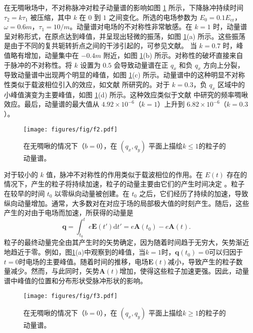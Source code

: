 在无啁啾场中，不对称脉冲对粒子动量谱的影响如图 \ref{2} 所示，下降脉冲持续时间 $\tau_2 = k\tau_1$ 被压缩，其中 $k$ 在 $0$ 到 $1$ 之间变化。所选的电场参数为 $E_0 = 0.1E_{\mathrm{cr}}$，$\omega = 0.6m$，$\tau_1 = 10/m$。动量谱对电场的不对称性非常敏感。在 $k = 1$ 时，动量谱呈对称形式，在原点达到峰值，并呈现出轻微的振荡，如图 \ref{2}(a) 所示。这些振荡是由于不同的复共轭转折点之间的干涉引起的，可参见文献\cite{2010c}。
当 $k = 0.7$ 时，峰值略有增加，动量集中在 $-0.4m$ 附近，如图 \ref{2}(b) 所示。对称性的破坏直接来自于脉冲的不对称性。将 $k$ 设置为 $0.5$ 会导致动量谱在正 $q_x$ 和负 $q_x$ 方向上分裂，导致动量谱中出现两个明显的峰值，如图 \ref{2}(c) 所示。动量谱中的这种明显不对称性类似于载波相位引入的效应，如文献 \cite{2010h} 所研究的。对于 $k = 0.3$，负 $q_x$ 区域中的小峰值演变为主要峰值，如图 \ref{2}(d) 所示。这种效应类似于文献 \cite{2019c} 中研究的频率啁啾效应。最后，动量谱的最大值从 $4.92\times 10^{-6}$（$k = 1$）上升到 $6.82\times 10^{-6}$（$k = 0.3$）。

\begin{figure}
  \centering
  \texttt{[image: figures/fig/f2.pdf]}
  \caption{在无啁啾的情况下（$b = 0$），在 $(q_x, q_y)$ 平面上描绘$k \le 1$的粒子的动量谱。}
  \label{2}
\end{figure}

对于较小的 $k$ 值，脉冲不对称性的作用类似于载波相位的作用。在 $E(t)$ 存在的情况下，产生的粒子将持续加速，粒子的动量主要由它们的产生时间决定 \cite{2011h,2018ck}。粒子在较早的时间 $t_0$ 以零纵向动量被创建。在 $t_0$ 之后，它们经历了持续的加速，导致纵向动量增加。通常，大多数对在对应于场的局部极大值的时刻产生。随后，这些产生的对由于电场而加速，所获得的动量是 \cite{2019c}
\begin{equation}
{\mathbf{q}} = \int_{t_{0}}^{t} e \mathbf{E}(t') \mathrm{d} t' = e \mathbf{A}\left(t_{0}\right)-e \mathbf{A}(t).
\end{equation}
粒子的最终动量完全由其产生时的矢势确定，因为随着时间趋于无穷大，矢势渐近地趋近于零。例如，图\ref{2}(a)中观察到的峰值，当$k=1$时，$\mathbf{q}\left(t_{0}\right)=0$可以归因于$t=0$时电场的主要峰值。随着时间的推移，电场$\mathbf{E}(t)$减小，导致产生的粒子数量减少。然而，与此同时，矢势$\mathbf{A}(t)$增加，使得这些粒子加速更强。因此，动量谱中峰值的位置和分布形状受脉冲形状的影响。

\begin{figure}
  \centering
  \texttt{[image: figures/fig/f3.pdf]}
   \caption{在无啁啾的情况下（$b = 0$），在 $(q_x, q_y)$ 平面上描绘$k \ge 1$的粒子的动量谱。}
  \label{3}
\end{figure}

